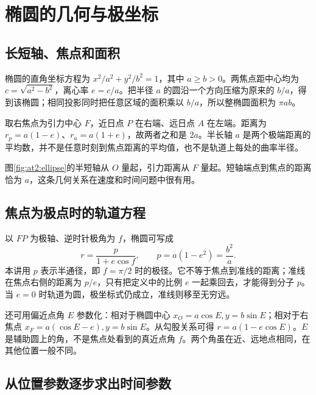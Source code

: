 \section{椭圆的几何与极坐标}
\subsection{长短轴、焦点和面积}

椭圆的直角坐标方程为 $x^2/a^2+y^2/b^2=1$，其中 $a\ge b>0$。两焦点距中心均为 $c=\sqrt{a^2-b^2}$，离心率 $e=c/a$。把半径 $a$ 的圆沿一个方向压缩为原来的 $b/a$，得到该椭圆；相同投影同时把任意区域的面积乘以 $b/a$，所以整椭圆面积为 $\pi ab$。

取右焦点为引力中心 $F$，近日点 $P$ 在右端、远日点 $A$ 在左端。距离为 $r_p=a(1-e)$、$r_a=a(1+e)$，故两者之和是 $2a$。半长轴 $a$ 是两个极端距离的平均数，并不是任意时刻到焦点距离的平均值，也不是轨道上每处的曲率半径。

图\ref{fig:at2:ellipse}的半短轴从 $O$ 量起，引力距离从 $F$ 量起。短轴端点到焦点的距离恰为 $a$，这条几何关系在速度和时间问题中很有用。\subsection{焦点为极点时的轨道方程}

以 $FP$ 为极轴、逆时针极角为 $f$，椭圆可写成
\[r=\frac{p}{1+e\cos f},\qquad p=a(1-e^2)=\frac{b^2}{a}.\]
本讲用 $p$ 表示半通径，即 $f=\pi/2$ 时的极径。它不等于焦点到准线的距离；准线在焦点右侧的距离为 $p/e$，只有把定义中的比例 $e$ 一起乘回去，才能得到分子 $p$。当 $e=0$ 时轨道为圆，极坐标式仍成立，准线则移至无穷远。

还可用偏近点角 $E$ 参数化：相对于椭圆中心 $x_O=a\cos E,y=b\sin E$；相对于右焦点 $x_F=a(\cos E-e),y=b\sin E$。从勾股关系可得 $r=a(1-e\cos E)$。$E$ 是辅助圆上的角，不是焦点处看到的真近点角 $f$。两个角虽在近、远地点相同，在其他位置一般不同。


\subsection{从位置参数逐步求出时间参数}

